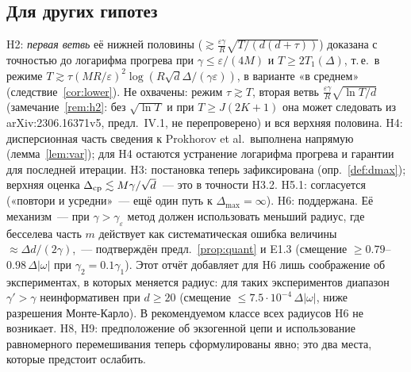 \documentclass[11pt,a4paper]{article}
\numberwithin{equation}{section}
\theoremstyle{definition}
\theoremstyle{remark}
\newcommand{\Dmax}{\Delta_{\max}}\newcommand{\Dcp}{\Delta_{\rm cp}}
\begin{document}
\subsection{Для других гипотез}
H2: \emph{первая ветвь} её нижней половины ($\gtrsim\frac{\varepsilon\gamma}R\sqrt{T/(d(d+\tau))}$) доказана с точностью до логарифма прогрева при $\gamma\le\varepsilon/(4M)$ и $T\ge2T_1(\Delta)$, т.\,е.\ в режиме $T\gtrsim\tau(MR/\varepsilon)^2\log(R\sqrt d\Delta/(\gamma\varepsilon))$, в варианте «в среднем» (следствие~\ref{cor:lower}). Не охвачены: режим $\tau\gtrsim T$, вторая ветвь $\frac{\varepsilon\gamma}R\sqrt{\ln T/d}$ (замечание~\ref{rem:h2}: без $\sqrt{\ln T}$ и при $T\ge J(2K+1)$ она может следовать из arXiv:2306.16371v5, предл.~IV.1, не перепроверено) и вся верхняя половина.
H4: дисперсионная часть сведения к Prokhorov et al.\ выполнена напрямую (лемма~\ref{lem:var}); для H4 остаются устранение логарифма прогрева и гарантии для последней итерации.
H3: постановка теперь зафиксирована (опр.~\ref{def:dmax}); верхняя оценка $\Dcp\lesssim M\gamma/\sqrt d$~--- это в точности H3.2.
H5.1: согласуется («повтори и усредни»~--- ещё один путь к $\Dmax=\infty$).
H6: поддержана. Её механизм~--- при $\gamma>\gamma_\varepsilon$ метод должен использовать меньший радиус, где бесселева часть $m$ действует как систематическая ошибка величины $\approx\Delta d/(2\gamma)$,~--- подтверждён предл.~\ref{prop:quant} и E1.3 (смещение $\ge0.79$--$0.98\,\Delta|\omega|$ при $\gamma_2=0.1\gamma_1$). Этот отчёт добавляет для H6 лишь соображение об экспериментах, в которых меняется радиус: для таких экспериментов диапазон $\gamma'>\gamma$ неинформативен при $d\ge20$ (смещение $\le7.5\cdot10^{-4}\,\Delta|\omega|$, ниже разрешения Монте-Карло). В рекомендуемом классе всех радиусов H6 не возникает.
H8, H9: предположение об экзогенной цепи и использование равномерного перемешивания теперь сформулированы явно; это два места, которые предстоит ослабить.
\end{document}

